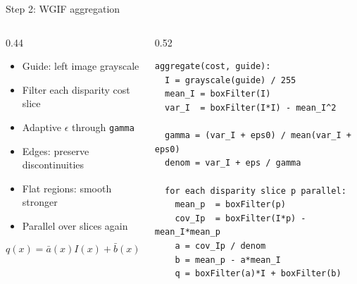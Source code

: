 \documentclass[aspectratio=169,11pt]{beamer}
\newcommand{\code}[1]{\texttt{#1}}
\begin{document}
\begin{frame}[fragile]{Step 2: WGIF aggregation}
\begin{columns}[T,totalwidth=\textwidth]
\begin{column}{0.44\textwidth}
\begin{itemize}
    \item Guide: left image grayscale
    \item Filter each disparity cost slice
    \item Adaptive $\epsilon$ through \code{gamma}
    \item Edges: preserve discontinuities
    \item Flat regions: smooth stronger
    \item Parallel over slices again
\end{itemize}
\vspace{0.2em}
\[
q(x)=\bar a(x)I(x)+\bar b(x)
\]
\end{column}
\begin{column}{0.52\textwidth}
\scriptsize
\begin{verbatim}
aggregate(cost, guide):
  I = grayscale(guide) / 255
  mean_I = boxFilter(I)
  var_I  = boxFilter(I*I) - mean_I^2

  gamma = (var_I + eps0) / mean(var_I + eps0)
  denom = var_I + eps / gamma

  for each disparity slice p parallel:
    mean_p  = boxFilter(p)
    cov_Ip  = boxFilter(I*p) - mean_I*mean_p
    a = cov_Ip / denom
    b = mean_p - a*mean_I
    q = boxFilter(a)*I + boxFilter(b)
\end{verbatim}
\end{column}
\end{columns}
\end{frame}


\end{document}
